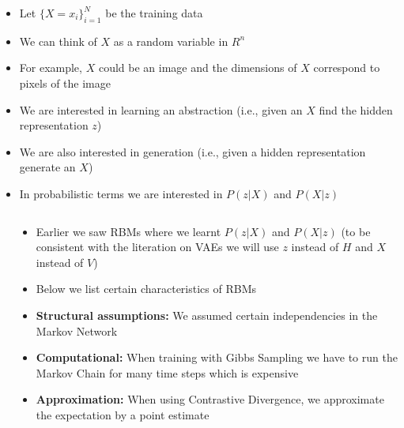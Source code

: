 \documentclass[serif,aspectratio=169,dvipsnames]{beamer}
\begin{document}
\begin{frame}
\begin{columns}
\begin{overlayarea}{\textwidth}{\textheight}
			\begin{itemize}\justifying
				\item<1-> Let $\{X = x_i\}_{i=1}^{N}$ be the training data
				\item<2-> We can think of $X$ as a random variable in $R^{n}$
				\item<3-> For example, $X$ could be an image and the dimensions of $X$ correspond to pixels of the image
				\item<4-> We are interested in learning an abstraction (i.e., given an $X$ find the hidden representation $z$)
				\item<5-> We are also interested in generation (i.e., given a hidden representation generate an $X$)
				\item<6-> In probabilistic terms we are interested in $P(z|X)$ and $P(X|z)$  
			\end{itemize}
		\end{overlayarea}
	\end{columns}
\end{frame}


\begin{frame}
	\begin{columns}
		\begin{overlayarea}{\textwidth}{\textheight}
						
		\end{overlayarea}
		\begin{overlayarea}{\textwidth}{\textheight}
			\begin{itemize}\justifying
				\item<1-> Earlier we saw RBMs where we learnt $P(z|X)$ and $P(X|z)$ (to be consistent with the literation on VAEs we will use $z$ instead of $H$ and $X$ instead of $V$) 
				\item<2-> Below we list certain characteristics of RBMs
				\item<3-> \textbf{Structural assumptions:} We assumed certain independencies in the Markov Network
				\item<4-> \textbf{Computational:} When training with Gibbs Sampling we have to run the Markov Chain for many time steps which is expensive 
				\item<5-> \textbf{Approximation:} When using Contrastive Divergence, we approximate the expectation by a point estimate
			\end{itemize}
		\end{overlayarea}
	\end{columns}
\end{frame}
\end{document}
